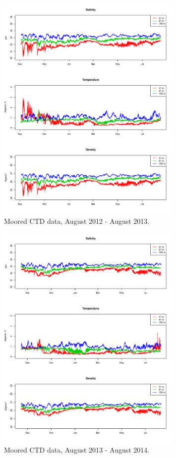 \documentclass[12pt]{dforeport}
\begin{document}
\begin{figure}
\centering
\includegraphics[width = 0.8\textwidth]{./figures/06_mctd_2012_2013.png}
\caption[Moored CTD, August 2012-2013]{Moored CTD data, August 2012 - August 2013.}
\label{f:mctd_2012_2013}
\end{figure}

\begin{figure}
\centering
\includegraphics[width = 0.8\textwidth]{./figures/07_mctd_2013_2014.png}
\caption[Moored CTD, August 2013-2014]{Moored CTD data, August 2013 - August 2014.}
\label{f:mctd_2013_2014}
\end{figure}
\end{document}
